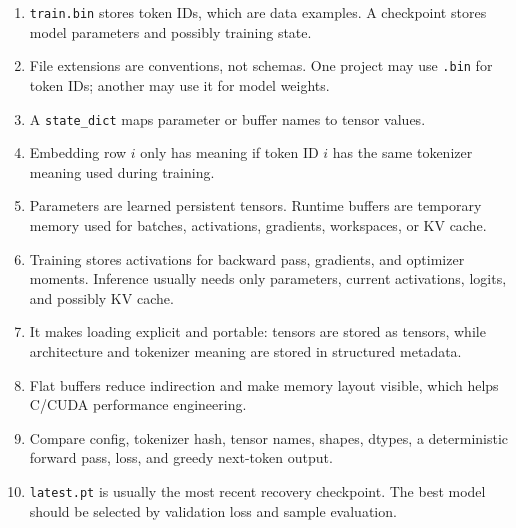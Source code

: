 \begin{enumerate}
  \item \texttt{train.bin} stores token IDs, which are data examples. A checkpoint stores
  model parameters and possibly training state.
  \item File extensions are conventions, not schemas. One project may use \texttt{.bin}
  for token IDs; another may use it for model weights.
  \item A \texttt{state\_dict} maps parameter or buffer names to tensor values.
  \item Embedding row \(i\) only has meaning if token ID \(i\) has the same tokenizer
  meaning used during training.
  \item Parameters are learned persistent tensors. Runtime buffers are temporary memory
  used for batches, activations, gradients, workspaces, or KV cache.
  \item Training stores activations for backward pass, gradients, and optimizer moments.
  Inference usually needs only parameters, current activations, logits, and possibly KV
  cache.
  \item It makes loading explicit and portable: tensors are stored as tensors, while
  architecture and tokenizer meaning are stored in structured metadata.
  \item Flat buffers reduce indirection and make memory layout visible, which helps C/CUDA
  performance engineering.
  \item Compare config, tokenizer hash, tensor names, shapes, dtypes, a deterministic
  forward pass, loss, and greedy next-token output.
  \item \texttt{latest.pt} is usually the most recent recovery checkpoint. The best model
  should be selected by validation loss and sample evaluation.
\end{enumerate}
